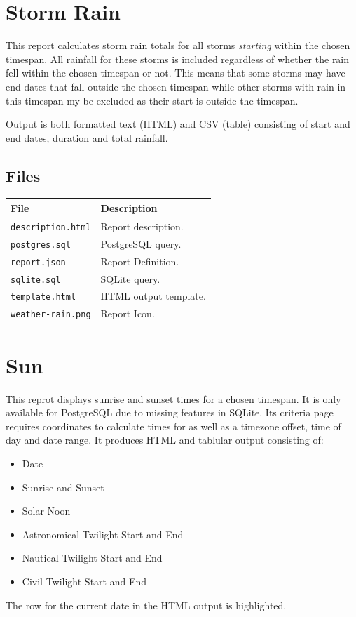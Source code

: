 \documentclass[a4paper,10pt]{book}
\begin{document}
\section{Storm Rain}
This report calculates storm rain totals for all storms \emph{starting} within the chosen timespan. All rainfall for these storms is included regardless of whether the rain fell within the chosen timespan or not. This means that some storms may have end dates that fall outside the chosen timespan while other storms with rain in this timespan my be excluded as their start is outside the timespan.

Output is both formatted text (HTML) and CSV (table) consisting of start and end dates, duration and total rainfall.

\subsection{Files}
\begin{tabular}{p{4.5cm} l}
\hline
\textbf{File} & \textbf{Description} \\
\hline
\verb|description.html| & Report description. \\
\verb|postgres.sql| & PostgreSQL query.\\
\verb|report.json| & Report Definition.\\
\verb|sqlite.sql| & SQLite query.\\
\verb|template.html| & HTML output template.\\
\verb|weather-rain.png| & Report Icon.\\
\hline
\end{tabular}

\section{Sun}
This reprot displays sunrise and sunset times for a chosen timespan. It is only available for PostgreSQL due to missing features in SQLite. Its criteria page requires coordinates to calculate times for as well as a timezone offset, time of day and date range. It produces HTML and tablular output consisting of:
\begin{itemize}
\item Date
\item Sunrise and Sunset
\item Solar Noon
\item Astronomical Twilight Start and End
\item Nautical Twilight Start and End
\item Civil Twilight Start and End
\end{itemize}
The row for the current date in the HTML output is highlighted.
\end{document}
